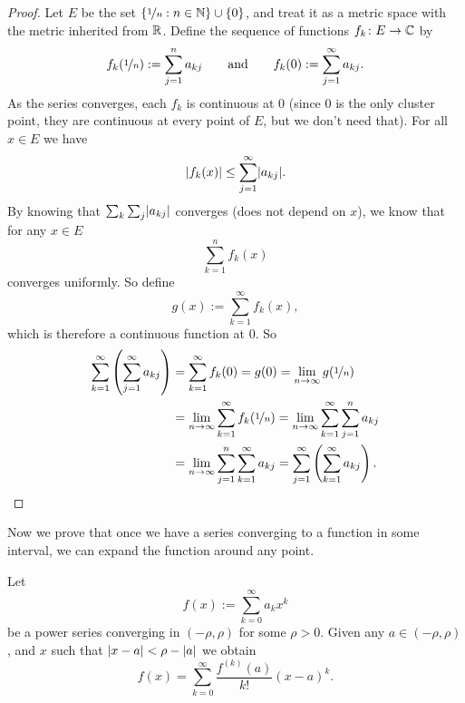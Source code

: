 \begin{proof}
Let $E$ be the set $\{ \nicefrac{1}{n} : n \in {\mathbb{N}} \} \cup \{ 0 \}$,
and treat it as a metric space with the metric inherited from ${\mathbb{R}}$.
Define the sequence of functions $f_k \colon E \to {\mathbb{C}}$
by
\begin{equation*}
f_k(\nicefrac{1}{n}) := \sum_{j=1}^n a_{kj}
\qquad
\text{and}
\qquad
f_k(0) := \sum_{j=1}^\infty a_{kj} .
\end{equation*}
As the series converges, each $f_k$ is continuous at $0$
(since 0 is the only cluster point, they are continuous at every point of
$E$, but we don't need that).
For all $x \in E$ we have
\begin{equation*}
\lvert {f_k(x)} \rvert \leq \sum_{j=1}^\infty \lvert {a_{kj}} \rvert .
\end{equation*}
By knowing that $\sum_k \sum_j \lvert {a_{kj}} \rvert$ converges (does not depend on
$x$), we know that for any $x \in E$
\begin{equation*}
\sum_{k=1}^n f_k(x)
\end{equation*}
converges uniformly.  So define
\begin{equation*}
g(x) := \sum_{k=1}^\infty f_k(x) ,
\end{equation*}
which is therefore a continuous function at $0$.
So
\begin{equation*}
\begin{split}
\sum_{k=1}^\infty \left( \sum_{j=1}^\infty a_{kj} \right)
& =
\sum_{k=1}^\infty f_k(0)
= g(0)
= \lim_{n\to\infty} g(\nicefrac{1}{n}) \\
&= 
\lim_{n\to\infty}\sum_{k=1}^\infty f_k(\nicefrac{1}{n})
= 
\lim_{n\to\infty}\sum_{k=1}^\infty \sum_{j=1}^n a_{kj} \\
&= 
\lim_{n\to\infty}\sum_{j=1}^n \sum_{k=1}^\infty a_{kj}
= 
\sum_{j=1}^\infty \left( \sum_{k=1}^\infty a_{kj} \right) . \qedhere
\end{split}
\end{equation*}
\end{proof}

Now we prove that once we have a series converging to a function
in some interval, we can expand the function around any point.

\begin{thm}
%
\label{thm:tayloranal}
Let
\begin{equation*}
f(x) := \sum_{k=0}^\infty a_k x^k
\end{equation*}
be a power series converging in $(-\rho,\rho)$ for some $\rho > 0$.  Given any $a \in
(-\rho,\rho)$,
and $x$ such that $\lvert {x-a} \rvert < \rho-\lvert {a} \rvert$ we obtain
\begin{equation*}
f(x) =
\sum_{k=0}^\infty \frac{f^{(k)}(a)}{k!} {(x-a)}^{k} .
\end{equation*}
\end{thm}

